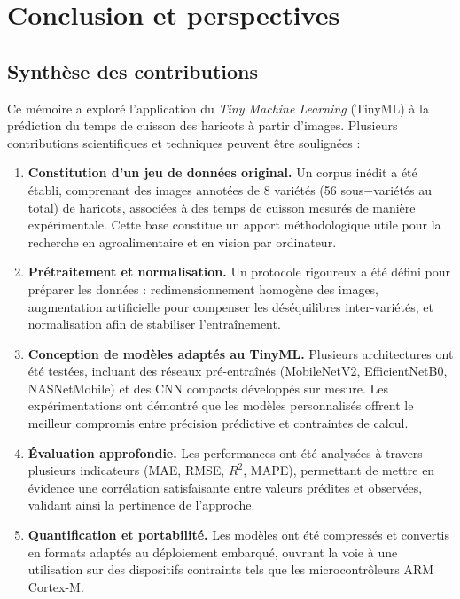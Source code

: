 \chapter{Conclusion et perspectives}
\label{chap:conclusion_et_perspectives}

\section{Synthèse des contributions}
\label{sec:synthese_contributions}

Ce mémoire a exploré l’application du \textit{Tiny Machine Learning} (TinyML) à la prédiction du temps de cuisson des haricots à partir d’images. Plusieurs contributions scientifiques et techniques peuvent être soulignées :

\begin{enumerate}
    \item \textbf{Constitution d’un jeu de données original.} Un corpus inédit a été établi, comprenant des images annotées de 8 variétés (56 sous\(-\)variétés au total) de haricots, associées à des temps de cuisson mesurés de manière expérimentale. Cette base constitue un apport méthodologique utile pour la recherche en agroalimentaire et en vision par ordinateur.
    
    \item \textbf{Prétraitement et normalisation.} Un protocole rigoureux a été défini pour préparer les données : redimensionnement homogène des images, augmentation artificielle pour compenser les déséquilibres inter-variétés, et normalisation afin de stabiliser l’entraînement.
    
    \item \textbf{Conception de modèles adaptés au TinyML.} Plusieurs architectures ont été testées, incluant des réseaux pré-entraînés (MobileNetV2, EfficientNetB0, NASNetMobile) et des CNN compacts développés sur mesure. Les expérimentations ont démontré que les modèles personnalisés offrent le meilleur compromis entre précision prédictive et contraintes de calcul.
    
    \item \textbf{Évaluation approfondie.} Les performances ont été analysées à travers plusieurs indicateurs (MAE, RMSE, $R^2$, MAPE), permettant de mettre en évidence une corrélation satisfaisante entre valeurs prédites et observées, validant ainsi la pertinence de l’approche.
    
    \item \textbf{Quantification et portabilité.} Les modèles ont été compressés et convertis en formats adaptés au déploiement embarqué, ouvrant la voie à une utilisation sur des dispositifs contraints tels que les microcontrôleurs ARM Cortex-M.
\end{enumerate}

